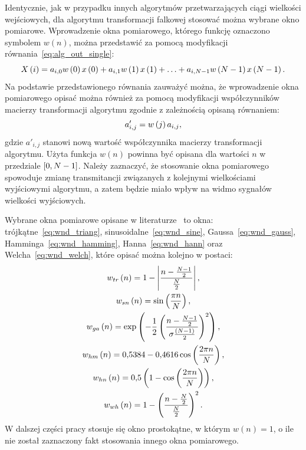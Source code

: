 Identycznie, jak w przypadku innych algorytmów przetwarzających ciągi wielkości wejściowych, dla algorytmu transformacji falkowej stosować można wybrane okno pomiarowe. Wprowadzenie okna pomiarowego, którego funkcję oznaczono symbolem $w(n)$, można przedstawić za pomocą modyfikacji równania~\eqref{eq:alg_out_single}:
\begin{equation}
X \left(i\right) = a_{i, 0} w \left(0\right) x \left(0\right) + a_{i, 1} w \left(1\right) x \left(1\right) + \hdots + a_{i, N-1} w \left(N-1\right) x \left(N-1\right) \label{eq:wt_singlewindow}.
\end{equation}
Na podstawie przedstawionego równania zauważyć można, że wprowadzenie okna pomiarowego opisać można również za pomocą modyfikacji współczynników macierzy transformacji algorytmu zgodnie z zależnością opisaną równaniem:
\begin{equation}
a'_{i,j} = w \left(j\right) a_{i,j} \label{eq:wt_windowmod},
\end{equation}
gdzie $a'_{i,j}$ stanowi nową wartość współczynnika macierzy transformacji algorytmu. Użyta funkcja $w(n)$ powinna być opisana dla wartości $n$ w przedziale $\interval{0}{N-1}$. Należy zaznaczyć, że stosowanie okna pomiarowego spowoduje zmianę transmitancji związanych z kolejnymi wielkościami wyjściowymi algorytmu, a zatem będzie miało wpływ na widmo sygnałów wielkości wyjściowych.

Wybrane okna pomiarowe opisane w literaturze~\cite{oppenheim_dsp, oppenheim_sns, proakis_dsp} to okna: trójkątne~\eqref{eq:wnd_triang}, sinusoidalne~\eqref{eq:wnd_sine}, Gaussa~\eqref{eq:wnd_gauss}, Hamminga~\eqref{eq:wnd_hamming}, Hanna~\eqref{eq:wnd_hann} oraz Welcha~\eqref{eq:wnd_welch}, które opisać można kolejno w postaci:
\begin{gather}
w_{tr} \left(n\right) = 1 - \left| \frac{n - \frac{N-1}{2}}{\frac{N}{2}} \right| \label{eq:wnd_triang}, \\
w_{sn} \left(n\right) = \sin \left( \frac{\pi n}{N} \right) \label{eq:wnd_sine}, \\
w_{ga} \left(n\right) = \exp \left(-\frac{1}{2} \left( \frac{n - \frac{N-1}{2}}{\sigma \frac{\left(N-1\right)}{2}} \right)^{2} \right) \label{eq:wnd_gauss}, \\
w_{hm} \left(n\right) = \num{0.5384} - \num{0.4616} \cos \left( \frac{2 \pi n}{N} \right) \label{eq:wnd_hamming}, \\
w_{hn} \left(n\right) = \num{0.5} \left(1 - \cos \left( \frac{2 \pi n}{N} \right) \right) \label{eq:wnd_hann}, \\
w_{wh} \left(n\right) = 1 - \left( \frac{n - \frac{N}{2}}{\frac{N}{2}} \right)^{2} \label{eq:wnd_welch}.
\end{gather}
W dalszej części pracy stosuje się okno prostokątne, w którym $w(n) = 1$, o ile nie został zaznaczony fakt stosowania innego okna pomiarowego.

